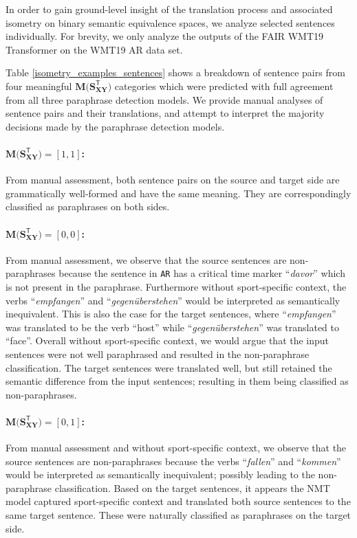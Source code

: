\documentclass[11pt,a4paper]{article}
\begin{document}
In order to gain ground-level insight of the translation process and associated isometry on binary semantic equivalence spaces, we analyze selected sentences individually. For brevity, we only analyze the outputs of the FAIR WMT19 Transformer on the WMT19 AR data set.

Table \ref{isometry_examples_sentences} shows a breakdown of sentence pairs from four meaningful $\mathbf{M(S_{XY}^{\mathsf{T}}})$ categories which were predicted with full agreement from all three paraphrase detection models. We provide manual analyses of sentence pairs and their translations, and attempt to interpret the majority decisions made by the paraphrase detection models.

\paragraph{$\mathbf{M(S_{XY}^{\mathsf{T}}}) = [1,1]$:} From manual assessment, both sentence pairs on the source and target side are grammatically well-formed and have the same meaning. They are correspondingly classified as paraphrases on both sides.
\paragraph{$\mathbf{M(S_{XY}^{\mathsf{T}}}) = [0,0]$:} From manual assessment, we observe that the source sentences are non-paraphrases because the sentence in \texttt{AR} has a critical time marker ``\textit{davor}'' which is not present in the paraphrase. Furthermore without sport-specific context, the verbs ``\textit{empfangen}'' and ``\textit{gegenüberstehen}'' would be interpreted as semantically inequivalent. This is also the case for the target sentences, where ``\textit{empfangen}'' was translated to be the verb ``host'' while ``\textit{gegenüberstehen}'' was translated to ``face''. Overall without sport-specific context, we would argue that the input sentences were not well paraphrased and resulted in the non-paraphrase classification. The target sentences were translated well, but still retained the semantic difference from the input sentences; resulting in them being classified as non-paraphrases.
\paragraph{$\mathbf{M(S_{XY}^{\mathsf{T}}}) = [0,1]$:} From manual assessment and without sport-specific context, we observe that the source sentences are non-paraphrases because the verbs ``\textit{fallen}'' and ``\textit{kommen}'' would be interpreted as semantically inequivalent; possibly leading to the non-paraphrase classification. Based on the target sentences, it appears the NMT model captured sport-specific context and translated both source sentences to the same target sentence. These were naturally classified as paraphrases on the target side.
\end{document}
